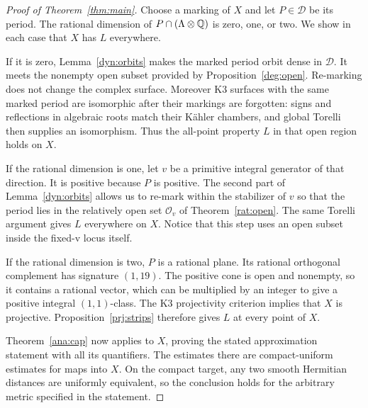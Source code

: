 \begin{proof}[Proof of Theorem~\ref{thm:main}]
Choose a marking of $X$ and let $P\in\mathcal D$ be its period.
The rational dimension of $P\cap(\Lambda\otimes\mathbb Q)$ is zero,
one, or two. We show in each case that $X$ has $L$ everywhere.

If it is zero, Lemma~\ref{dyn:orbits} makes the marked period
orbit dense in $\mathcal D$. It meets the nonempty open subset
provided by Proposition~\ref{deg:open}. Re-marking does not change
the complex surface. Moreover K3 surfaces with the same marked
period are isomorphic after their markings are forgotten: signs
and reflections in algebraic roots match their K\"ahler
chambers, and global Torelli then supplies an isomorphism.
Thus the all-point property $L$ in that open region holds on $X$.

If the rational dimension is one, let $v$ be a primitive
integral generator of that direction. It is positive because
$P$ is positive. The second part of Lemma~\ref{dyn:orbits}
allows us to re-mark within the stabilizer of $v$ so that the
period lies in the relatively open set $\mathcal O_v$ of
Theorem~\ref{rat:open}. The same Torelli argument gives $L$
everywhere on $X$. Notice that this step uses an open subset
inside the fixed-v locus itself.

If the rational dimension is two, $P$ is a rational plane.
Its rational orthogonal complement has signature $(1,19)$.
The positive cone is open and nonempty, so it contains a
rational vector, which can be multiplied by an integer to give
a positive integral $(1,1)$-class. The K3 projectivity criterion
implies that $X$ is projective. Proposition~\ref{prj:strips}
therefore gives $L$ at every point of $X$.

Theorem~\ref{ana:cap} now applies to $X$, proving the stated
approximation statement with all its quantifiers. The estimates
there are compact-uniform estimates for maps into $X$.
On the compact target, any two smooth Hermitian distances are
uniformly equivalent, so the conclusion holds for the
arbitrary metric specified in the statement.
\end{proof}
